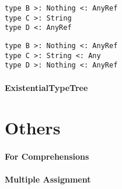 \begin{multicols}{2}
\begin{lstlisting}
type B >: Nothing <: AnyRef
type C >: String
type D <: AnyRef
\end{lstlisting}
\begin{lstlisting}  
type B >: Nothing <: AnyRef
type C >: String <: Any
type D >: Nothing <: AnyRef
\end{lstlisting}
\end{multicols}


\paragraph{ExistentialTypeTree} 

\section{Others}

\paragraph{For Comprehensions}

\paragraph{Multiple Assignment}





